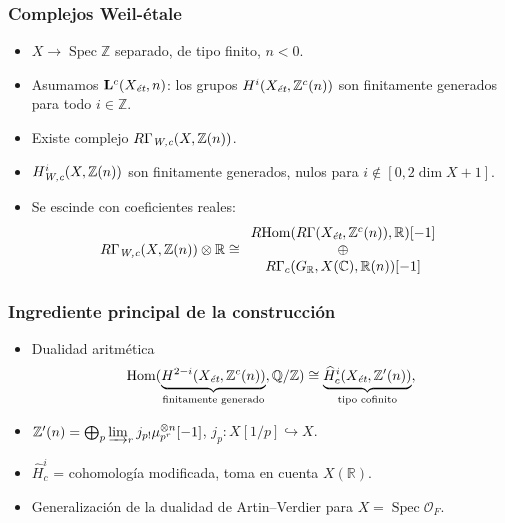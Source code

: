 \documentclass[handout]{beamer}
\newcommand{\CC}{\mathbb{C}}
\newcommand{\FF}{\mathbb{F}}
\newcommand{\QQ}{\mathbb{Q}}
\newcommand{\RR}{\mathbb{R}}
\newcommand{\ZZ}{\mathbb{Z}}
\DeclareMathOperator{\Hom}{Hom}
\DeclareMathOperator{\Spec}{Spec}
\newcommand{\et}{\text{\it ét}}
\newcommand{\Wc}{\text{\it W,c}}
\newcommand{\RHom}{R\!\Hom}
\begin{document}
\begin{frame}
  \frametitle{Complejos Weil-étale}

  \begin{itemize}
  \item $X \to \Spec \ZZ$ separado, de tipo finito, $n < 0$.

  \item Asumamos $\mathbf{L}^c (X_\et, n)$: los grupos $H^i (X_\et, \ZZ^c(n))$
    son finitamente generados para todo $i \in \ZZ$.

  \item Existe complejo $R\Gamma_\Wc (X, \ZZ(n))$.

  \item $H^i_\Wc (X, \ZZ(n))$ son finitamente generados, nulos para
    $i \notin [0, 2\dim X + 1]$.


  \item Se escinde con coeficientes reales:
    \[ R\Gamma_\Wc (X, \ZZ(n)) \otimes \RR \cong
      \begin{array}{c}
        \RHom(R\Gamma(X_\et, \ZZ^c(n)), \RR)[-1]\\
        \oplus \\
        R\Gamma_c (G_\RR, X(\CC), \RR(n))[-1]
      \end{array} \]
  \end{itemize}
\end{frame}


\begin{frame}
  \frametitle{Ingrediente principal de la construcción}

  \begin{itemize}
  \item Dualidad aritmética
    \[ \Hom (\underbrace{H^{2-i} (X_\et, \ZZ^c (n))}_{\text{finitamente generado}}, \QQ/\ZZ) \cong
      \underbrace{\widehat{H}^i_c (X_\et, \ZZ' (n))}_{\text{tipo cofinito}}, \]

  \item $\ZZ' (n) = \bigoplus_p \varinjlim_r j_{p!} \mu_{p^r}^{\otimes n} [-1]$,
    \quad $j_p\colon X[1/p] \hookrightarrow X$.

  \item $\widehat{H}^i_c$ = cohomología modificada, toma en cuenta $X (\RR)$.

  \item Generalización de la dualidad de Artin--Verdier para
    $X = \Spec \mathcal{O}_F$.
  \end{itemize}
\end{frame}
\end{document}

